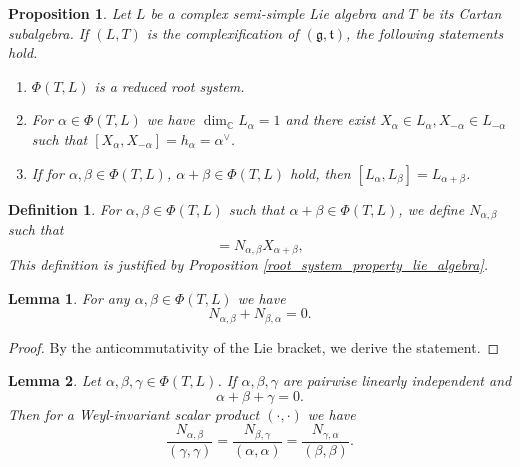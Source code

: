 \documentclass{article}
\newtheorem{proposition}{Proposition}[section]
\newtheorem{definition}{Definition}[section]
\newtheorem{lemma}{Lemma}[section]
\numberwithin{equation}{section}
\begin{document}
\begin{proposition}
Let $L$ be a complex semi-simple Lie algebra and $T$ be its Cartan subalgebra. If $(L,T)$ is the complexification of $(\mathfrak{g},\mathfrak{t})$, the following statements hold.
\begin{enumerate}
\item $\Phi(T,L)$ is a reduced root system.
\item For $\alpha\in\Phi(T,L)$ we have $\dim_\mathbb{C}L_\alpha=1$ and there exist $X_\alpha\in L_\alpha,X_{-\alpha}\in L_{-\alpha}$ such that $[X_\alpha,X_{-\alpha}]=h_\alpha=\alpha^\lor$.
\item If for $\alpha,\beta\in\Phi(T,L)$, $\alpha+\beta\in\Phi(T,L)$ hold, then $[L_\alpha,L_\beta] = L_{\alpha+\beta}$.
\end{enumerate}
\end{proposition}

\begin{definition}
For $\alpha, \beta\in\Phi(T,L)$ such that $\alpha+\beta\in \Phi(T,L)$, we define $N_{\alpha,\beta}$ such that 
\begin{equation*}
[X_\alpha,X_\beta] = N_{\alpha,\beta}X_{\alpha+\beta},
\end{equation*}
This definition is justified by Proposition \ref{root_system_property_lie_algebra}.
\end{definition}

\begin{lemma}
For any $\alpha,\beta\in\Phi(T,L)$ we have
\begin{equation*}
N_{\alpha,\beta} +N_{\beta,\alpha} = 0.
\end{equation*}
\end{lemma}
\begin{proof}
By the anticommutativity of the Lie bracket, we derive the statement.
\end{proof}

\begin{lemma}
Let $\alpha,\beta,\gamma\in\Phi(T,L)$. If $\alpha,\beta,\gamma$ are pairwise linearly independent and 
\begin{equation*}
\alpha+\beta+\gamma = 0.
\end{equation*}
Then for a Weyl-invariant scalar product $(\cdot,\cdot)$ we have
\begin{equation*}
{\frac {N_{\alpha,\beta}} {(\gamma,\gamma)}}={\frac {N_{\beta,\gamma}} {(\alpha,\alpha)}}={\frac {N_{\gamma,\alpha}} {(\beta,\beta)}}.
\end{equation*}
\end{lemma}
\end{document}
